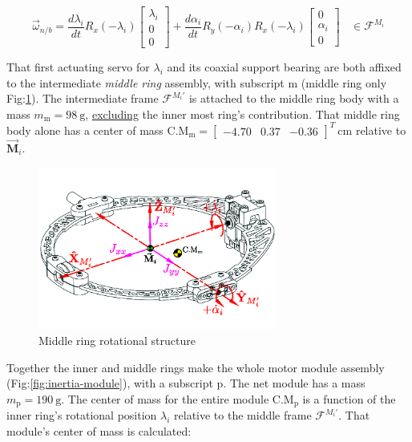 \begin{equation}\label{eq:net-angular-inner}
\vec{\omega}_{n/b}=\frac{d\lambda_i}{dt}R_x(-\lambda_i)\begin{bmatrix}
\lambda_i\\
0\\
0
\end{bmatrix}
+\frac{d\alpha_i}{dt}R_y(-\alpha_i)R_x(-\lambda_i)\begin{bmatrix}
0\\
\alpha_i\\
0
\end{bmatrix}~~~~\in\mathcal{F}^{M_i}
\end{equation}
\par
That first actuating servo for $\lambda_i$ and its coaxial support bearing are both affixed to the intermediate \emph{middle ring} assembly, with subscript m (middle ring only Fig:\ref{fig:inertia-middle}). The intermediate frame $\mathcal{F}^{M_i'}$ is attached to the middle ring body with a mass $m_\text{m}=98~\text{g}$, \underline{excluding} the inner most ring's contribution. That middle ring body alone has a center of mass $\text{C.M}_{\text{m}}=\begin{bmatrix}
-4.70&0.37&-0.36\end{bmatrix}^T~\text{cm}$ relative to $\vec{\mathbf{M}}_i$. 
\begin{figure}[htbp]
\centering
\includegraphics[width=0.7\textwidth]{figs/inertia-middle}
\vspace{-18pt}
\caption{Middle ring rotational structure}
\label{fig:inertia-middle}
\vspace{-12pt}
\end{figure}
\par
Together the inner and middle rings make the whole motor module assembly (Fig:\ref{fig:inertia-module}), with a subscript p. The net module has a mass $m_\text{p}=190~\text{g}$. The center of mass for the entire module $\text{C.M}_\text{p}$ is a function of the inner ring's rotational position $\lambda_i$ relative to the middle frame $\mathcal{F}^{M_i'}$. That module's center of mass is calculated:
